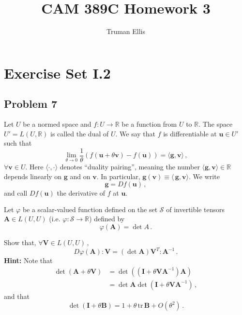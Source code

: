 \documentclass[letterpaper,10pt]{article}
\title{CAM 389C Homework 3}
\author{Truman Ellis}
\begin{document}
\maketitle

\section*{Exercise Set I.2}
\subsection*{Problem 7}
Let $U$ be a normed space and $f: U\rightarrow \mathbb{R}$ be a function from
$U$ to $\mathbb{R}$. The space $U'=L(U,\mathbb{R})$ is called the dual of $U$.
We say that $f$ is differentiable at $\mathbf{u}\in U'$ such that
\[
 \lim_{\theta\rightarrow0}\frac{1}{\theta}\left(f(\mathbf{u}
+\theta\mathbf{v})-f(\mathbf{u})\right)=\langle \mathbf{g},\mathbf{v}\rangle\,,
\]
$\forall \mathbf{v}\in U$. Here $\langle\cdot,\cdot\rangle$ denotes ``duality
pairing'', meaning the number
$\langle\mathbf{g},\mathbf{v}\rangle\in\mathbb{R}$ depends linearly on
$\mathbf{g}$ and on $\mathbf{v}$. In particular,
$\mathbf{g}(\mathbf{v})\equiv\langle\,\mathbf{g},\mathbf{v}\rangle$. We write
\[
 \mathbf{g}=Df(\mathbf{u})\,,
\]
and call $Df(\mathbf{u})$ the derivative of $f$ at $\mathbf{u}$.

Let $\varphi$ be a scalar-valued function defined on the set $\mathcal S$ of
invertible tensors $\mathbf{A}\in L(U,U)$ (i.e.
$\varphi:\mathcal{S}\rightarrow\mathbb{R}$) defined by
\[
 \varphi(\mathbf{A})=\det A\,.
\]

Show that, $\forall\mathbf{V}\in L(U,U)\,,$
\[
 D\varphi(\mathbf{A}):\mathbf{V}=(\det\mathbf{A})\mathbf{V}^T:\mathbf{A}^{-1}\,.
\]
\textbf{Hint:} Note that
\begin{align*}
 \det(\mathbf{A}+\theta\mathbf{V})&=\det((\mathbf{I}+\theta\mathbf{V}\mathbf{A}
^{-1})\mathbf{A})\\
&=\det\mathbf{A}\det(\mathbf{I}+\theta\mathbf{V}\mathbf{A}^{-1})\,,
\end{align*}
and that
\[
 \det(\mathbf{I}+\theta\mathbf{B})=1+\theta\,\mathrm{tr}\,\mathbf{B}+\mathit{O}
(\theta^2)\,.
\]
\end{document}
